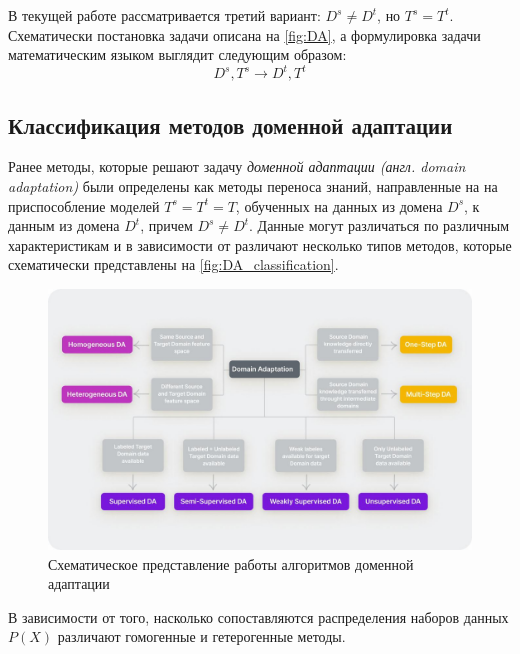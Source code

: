 В текущей работе рассматривается третий вариант: $D^s \ne D^t$, но $T^s = T^t$. Схематически постановка задачи описана на \autoref{fig:DA}, а формулировка задачи математическим языком выглядит следующим образом:
$$D^s, T^s \to D^t, T^t$$

\subsection{Классификация методов доменной адаптации}

Ранее методы, которые решают задачу \textit{доменной адаптации (англ. domain adaptation)}  были определены как методы переноса знаний, направленные на на приспособление моделей $T^s = T^t = T$, обученных на данных из домена $D^s$, к данным из домена $D^t$, причем $D^s \ne D^t$. Данные могут различаться по различным характеристикам и в зависимости от различают несколько типов методов, которые схематически представлены на \autoref{fig:DA_classification}.

\begin{figure}[h]
	\centering
	\includegraphics[width=.9\textwidth]{./images/DA_classification.jpg}
	\caption{Схематическое представление работы алгоритмов доменной адаптации}
	\label{fig:DA_classification}
\end{figure}

\hfill \break
В зависимости от того, насколько сопоставляются распределения наборов данных $P(X)$ различают гомогенные и гетерогенные методы.

